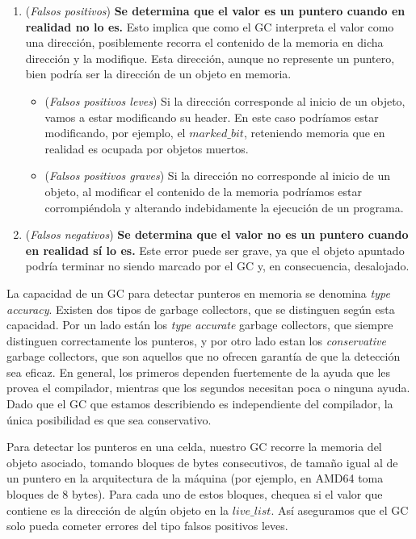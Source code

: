 \begin{enumerate}
	\item (\emph{Falsos positivos}) \textbf{Se determina que el valor es un puntero cuando en realidad no lo es.} Esto implica que como el GC interpreta el valor como una dirección, posiblemente recorra el contenido de la memoria en dicha dirección y la modifique. Esta dirección, aunque no represente un puntero, bien podría ser la dirección de un objeto en memoria.
	\begin{itemize}
		\item (\emph{Falsos positivos leves}) Si la dirección corresponde al inicio de un objeto, vamos a estar modificando su header. En este caso podríamos estar modificando, por ejemplo, el $marked\_bit$, reteniendo memoria que en realidad es ocupada por objetos muertos.
		\item (\emph{Falsos positivos graves}) Si la dirección no corresponde al inicio de un objeto, al modificar el contenido de la memoria podríamos estar corrompiéndola y alterando indebidamente la ejecución de un programa.
	\end{itemize}
	
	\item (\emph{Falsos negativos}) \textbf{Se determina que el valor no es un puntero cuando en realidad sí lo es.} Este error puede ser grave, ya que el objeto apuntado podría terminar no siendo marcado por el GC y, en consecuencia, desalojado.
\end{enumerate}

La capacidad de un GC para detectar punteros en memoria se denomina \textit{type accuracy}. Existen dos tipos de garbage collectors, que se distinguen según esta capacidad. Por un lado están los \textit{type accurate} garbage collectors, que siempre distinguen correctamente los punteros, y por otro lado estan los \textit{conservative} garbage collectors, que son aquellos que no ofrecen garantía de que la detección sea eficaz. En general, los primeros dependen fuertemente de la ayuda que les provea el compilador, mientras que los segundos necesitan poca o ninguna ayuda. Dado que el GC que estamos describiendo es independiente del compilador, la única posibilidad es que sea conservativo.

Para detectar los punteros en una celda, nuestro GC recorre la memoria del objeto asociado, tomando bloques de bytes consecutivos, de tamaño igual al de un puntero en la arquitectura de la máquina (por ejemplo, en AMD64 toma bloques de 8 bytes). Para cada uno de estos bloques, chequea si el valor que contiene es la dirección de algún objeto en la $live\_list$. Así aseguramos que el GC solo pueda cometer errores del tipo falsos positivos leves.

